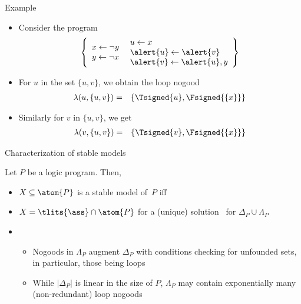 \begin{frame}{Example}
  \begin{itemize}
  \item<1-> Consider the program
    \[
    \left\{
      \begin{array}{l}
        x  \leftarrow  \neg y\\
        y  \leftarrow  \neg x
      \end{array}
      \
      \begin{array}{l}
        u  \leftarrow  x\\
        \alert{u}  \leftarrow  \alert{v}\\
        \alert{v}  \leftarrow  \alert{u}, y
      \end{array}
    \right\}
    \]
  \item<2-> For $u$ in the set $\{u,v\}$, we obtain the loop nogood
    \begin{eqnarray*}
      \lambda(u,\{u,v\}) &=& \{\Tsigned{u},\Fsigned{\{x\}}\}
    \end{eqnarray*}
  \item<3-> [] Similarly for $v$ in $\{u,v\}$, we get
    \begin{eqnarray*}
      \lambda(v,\{u,v\}) &=& \{\Tsigned{v},\Fsigned{\{x\}}\}
    \end{eqnarray*}
  \end{itemize}
\end{frame}
\begin{frame}{Characterization of stable models}
\begin{center}\pause
  \begin{minipage}[t]{0.8\linewidth}
    \begin{theorem}
      Let $P$ be a logic program. Then,
      \par\smallskip
      \begin{itemize}
      \item [] $X\subseteq\atom{P}$ is a stable model of~$P$ \alert{iff}
      \item [] $X=\tlits{\ass}\cap\atom{P}$ for a (unique) solution \ass\ for $\Delta_P\cup\Lambda_P$
    \end{itemize}
  \end{theorem}
  \end{minipage}
\end{center}
\bigskip
\pause
\begin{itemize}
\item {} \
\begin{itemize}\normalsize
\item
Nogoods in $\Lambda_P$ augment $\Delta_P$
with conditions checking for \alert{unfounded sets},
in particular,
those being loops
\smallskip
\item
While $|\Delta_P|$ is linear in the size of $P$,
$\Lambda_P$ may contain \alert{exponentially many} (non-redundant) loop nogoods
\end{itemize}
\end{itemize}
\end{frame}
%
